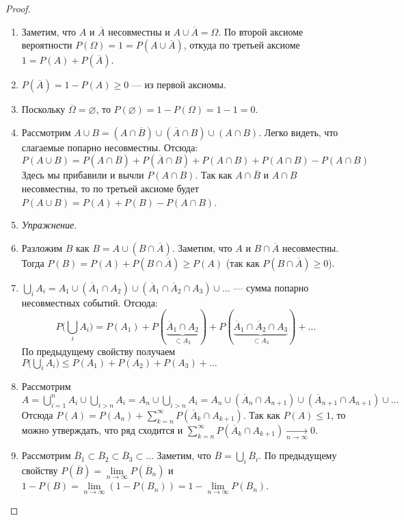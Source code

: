 \documentclass[11pt,openany,a4paper]{scrartcl}
\theoremstyle{plain}
\theoremstyle{definition}
\newcommand{\underto}[1]{\xrightarrow[#1]{}}
\newcommand{\ol}{\overline}
\begin{document}
\begin{proof}
\mbox{}
    \begin{enumerate}
        \item Заметим, что $A$ и $\ol A$ несовместны и $A \cup \ol A = \Omega$. По второй аксиоме
        вероятности $P(\Omega) = 1 = P(A \cup \ol A)$, откуда по третьей аксиоме
        $1 = P(A) + P(\ol A)$.
        \item $P(\ol A) = 1 - P(A) \geqslant 0$ — из первой аксиомы.
        \item Поскольку $\ol \Omega = \varnothing$, то $P(\varnothing) = 1 - P(\Omega) = 1-1 = 0$.
        \item Рассмотрим $A\cup B = (A \cap \ol B) \cup (\ol A \cap B) \cup (A \cap B)$. Легко
        видеть, что слагаемые попарно несовместны. Отсюда:
        $$
        P(A\cup B) = P(A\cap \ol B) + P(\ol A \cap B) + P(A\cap B) + P(A\cap B) - P(A\cap B)
        $$
        Здесь мы прибавили и вычли $P(A\cap B)$. Так как $A \cap \ol B$ и $A \cap B$ несовместны,
        то по третьей аксиоме будет $P(A\cup B) = P(A) + P(B) - P(A\cap B)$.
        \item \emph{Упражнение}.
        \item Разложим $B$ как $B = A \cup (B \cap \ol A)$.
        Заметим, что $A$ и $B \cap \ol A$ несовместны. Тогда
        $P(B) = P(A) + P(B\cap \ol A) \geqslant P(A)$ (так как $P(B\cap \ol A) \geqslant 0$).
        \item $\bigcup\limits_i A_i = A_1 \cup (\ol A_1 \cap A_2) \cup
        (\ol A_1 \cap \ol A_2 \cap A_3) \cup \ldots$ — сумма попарно несовместных событий.
        Отсюда:
        $$
        P\bigg(\bigcup\limits_i A_i\bigg) =
        P(A_1) + P(\underbrace{\ol A_1 \cap A_2}_{\subset A_2}) +
        P(\underbrace{\ol A_1 \cap \ol A_2 \cap A_3}_{\subset A_3}) + \ldots
        $$
        По предыдущему свойству получаем $P\Big(\bigcup\limits_i A_i\Big) \leqslant
        P(A_1) + P(A_2) + P(A_3) + \ldots$
        \item Рассмотрим $A = \bigcup\limits_{i=1}^n A_i \cup \bigcup\limits_{i > n} A_i =
        A_n \cup \bigcup\limits_{i > n}A_i =
        A_n \cup (\ol A_n \cap A_{n+1}) \cup (\ol A_{n+1} \cap A_{n+1}) \cup \ldots$
        Отсюда $P(A) = P(A_n) + \sum\limits_{k=n}^\infty P(\ol A_k \cap A_{k+1})$. Так как
        $P(A) \leqslant 1$, то можно утверждать, что ряд сходится и
        $\sum\limits_{k=n}^\infty P(\ol A_k \cap A_{k+1}) \underto{n \to \infty} 0$.
        \item Рассмотрим $\ol B_1 \subset \ol B_2 \subset \ol B_3 \subset \ldots$ Заметим, что
        $\ol B = \bigcup\limits_i \ol B_i$. По предыдущему свойству
        $P(\ol B) = \lim\limits_{n \to \infty} P(\ol B_n)$ и
        $1 - P(B) = \lim\limits_{n \to \infty} (1 - P(B_n)) =
        1 - \lim\limits_{n \to \infty} P(B_n)$.
    \end{enumerate}
\end{proof}
\end{document}

